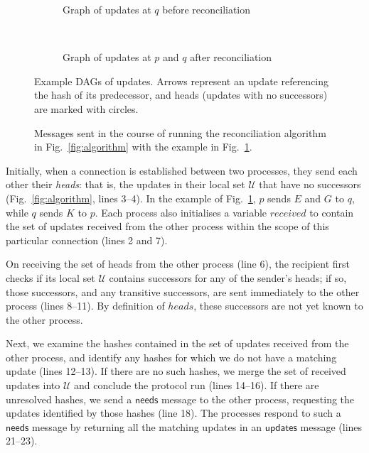 \documentclass[manuscript]{acmart}
\begin{document}
\begin{figure}
\begin{minipage}{0.4\linewidth}
\begin{subfigure}{\textwidth}
    
    \caption{Graph of updates at $q$ before reconciliation}
    \end{subfigure}\\[35pt]
    \begin{subfigure}{\textwidth}
    
    \caption{Graph of updates at $p$ and $q$ after reconciliation}
    \end{subfigure}
    \caption{Example DAGs of updates. Arrows represent an update referencing the hash of its predecessor, and heads (updates with no successors) are marked with circles.}
    \label{fig:example-dags}
\end{minipage}
\end{figure}

\begin{figure}
    \centering
    
    \caption{Messages sent in the course of running the reconciliation algorithm in Fig.~\ref{fig:algorithm} with the example in Fig.~\ref{fig:example-dags}.}
    \label{fig:messages}
\end{figure}

Initially, when a connection is established between two processes, they send each other their \emph{heads}: that is, the updates in their local set $\mathcal{U}$ that have no successors (Fig.~\ref{fig:algorithm}, lines 3--4).
In the example of Fig.~\ref{fig:example-dags}, $p$ sends $E$ and $G$ to $q$, while $q$ sends $K$ to $p$.
Each process also initialises a variable $\mathit{received}$ to contain the set of updates received from the other process within the scope of this particular connection (lines 2 and 7).

On receiving the set of heads from the other process (line 6), the recipient first checks if its local set $\mathcal{U}$ contains successors for any of the sender's heads; if so, those successors, and any transitive successors, are sent immediately to the other process (lines 8--11).
By definition of $\mathit{heads}$, these successors are not yet known to the other process.

Next, we examine the hashes contained in the set of updates received from the other process, and identify any hashes for which we do not have a matching update (lines 12--13).
If there are no such hashes, we merge the set of received updates into $\mathcal{U}$ and conclude the protocol run (lines 14--16).
If there are unresolved hashes, we send a $\mathsf{needs}$ message to the other process, requesting the updates identified by those hashes (line 18).
The processes respond to such a $\mathsf{needs}$ message by returning all the matching updates in an $\mathsf{updates}$ message (lines 21--23).
\end{document}
